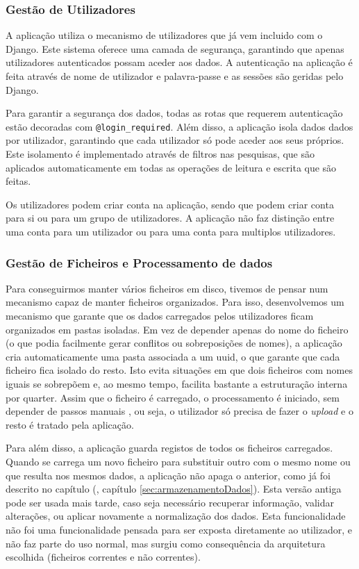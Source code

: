 \subsubsection{Gestão de Utilizadores}

A aplicação utiliza o mecanismo de utilizadores que já vem incluido com o Django. Este sistema oferece uma camada de segurança, garantindo que apenas utilizadores autenticados possam aceder aos dados. A autenticação na aplicação é feita através de nome de utilizador e palavra-passe e as sessões são geridas pelo Django.

Para garantir a segurança dos dados, todas as rotas que requerem autenticação estão decoradas com \texttt{@login\_required}. Além disso, a aplicação isola dados dados por utilizador, garantindo que cada utilizador só pode aceder aos seus próprios. Este isolamento é implementado através de filtros nas pesquisas, que são aplicados automaticamente em todas as operações de leitura e escrita que são feitas.

Os utilizadores podem criar conta na aplicação, sendo que podem criar conta para si ou para um grupo de utilizadores. A aplicação não faz distinção entre uma conta para um utilizador ou para uma conta para multiplos utilizadores.

\subsubsection{Gestão de Ficheiros e Processamento de dados}

Para conseguirmos manter vários ficheiros em disco, tivemos de pensar num mecanismo capaz de manter ficheiros organizados. Para isso, desenvolvemos um mecanismo que garante que os dados carregados pelos utilizadores ficam organizados em pastas isoladas. Em vez de depender apenas do nome do ficheiro (o que podia facilmente gerar conflitos ou sobreposições de nomes), a aplicação cria automaticamente uma pasta associada a um \gls{uuid}, o que garante que cada ficheiro fica isolado do resto. Isto evita situações em que dois ficheiros com nomes iguais se sobrepõem e, ao mesmo tempo, facilita bastante a estruturação interna por \gls{quarter}. Assim que o ficheiro é carregado, o processamento é iniciado, sem depender de passos manuais , ou seja, o utilizador só precisa de fazer o \textit{upload} e o resto é tratado pela aplicação.

Para além disso, a aplicação guarda registos de todos os ficheiros carregados. Quando se carrega um novo ficheiro para substituir outro com o mesmo nome ou que resulta nos mesmos dados, a aplicação não apaga o anterior, como já foi descrito no capítulo (\cf, capítulo \ref{sec:armazenamentoDados}). Esta versão antiga pode ser usada mais tarde, caso seja necessário recuperar informação, validar alterações, ou aplicar novamente a normalização dos dados. Esta funcionalidade não foi uma funcionalidade pensada para ser exposta diretamente ao utilizador, e não faz parte do uso normal, mas surgiu como consequência da arquitetura escolhida (ficheiros correntes e não correntes).

